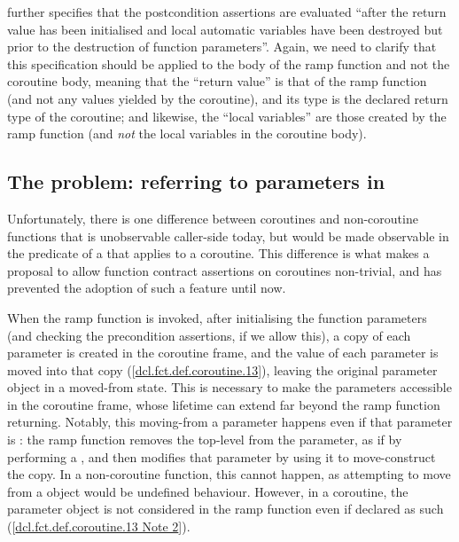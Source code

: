 \cite{P2900R8} further specifies that the postcondition assertions are evaluated ``after the return value has been initialised and local automatic variables have been destroyed but prior to the destruction of function parameters''. Again, we need to clarify that this specification should be applied to the body of the ramp function and not the coroutine body, meaning that the ``return value'' is that of the ramp function (and not any values yielded by the coroutine), and its type is the declared return type of the coroutine; and likewise, the ``local variables'' are those created by the ramp function (and \emph{not} the local variables in the coroutine body).

\subsection{The problem: referring to parameters in }
\label{paramsinpost}

Unfortunately, there is one difference between coroutines and non-coroutine functions that is unobservable caller-side today, but would be made observable in the predicate of a  that applies to a coroutine. This difference is what makes a proposal to allow function contract assertions on coroutines non-trivial, and has prevented the adoption of such a feature until now.

When the ramp function is invoked, after initialising the function parameters (and checking the precondition assertions, if we allow this), a copy of each parameter is created in the coroutine frame, and the value of each parameter is moved into that copy ([\href{https://eel.is/c++draft/dcl.fct.def.coroutine#13}{dcl.fct.def.coroutine.13}]), leaving the original parameter object in a moved-from state. This is necessary to make the parameters accessible in the coroutine frame, whose lifetime can extend far beyond the ramp function returning. Notably, this moving-from a parameter happens even if that parameter is : the ramp function removes the top-level  from the parameter, as if by performing a , and then modifies that parameter by using it to move-construct the copy. In a non-coroutine function, this cannot happen, as attempting to move from a  object would be undefined behaviour. However, in a coroutine, the parameter object is not considered  in the ramp function even if declared as such ([\href{https://eel.is/c++draft/dcl.fct.def.coroutine#note-2}{dcl.fct.def.coroutine.13 Note 2}]).

